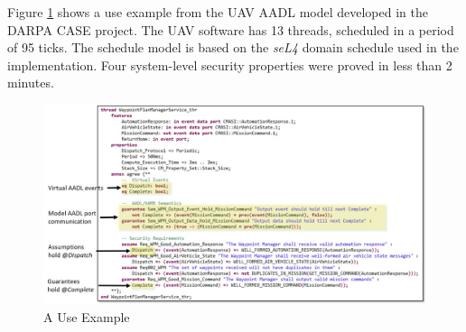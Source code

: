 Figure \ref{useCaseExample} shows a use example from the UAV AADL model developed in the DARPA CASE project. The UAV software has 13 threads, scheduled in a period of 95 ticks. The schedule model is based on the \emph{seL4} domain schedule used in the implementation. Four system-level security properties were proved in less than 2 minutes.

\begin{figure}[ht!]
\centering
\includegraphics[width=120mm]{useCaseExample.jpg}
\caption{A Use Example\label{useCaseExample}}
\end{figure}

